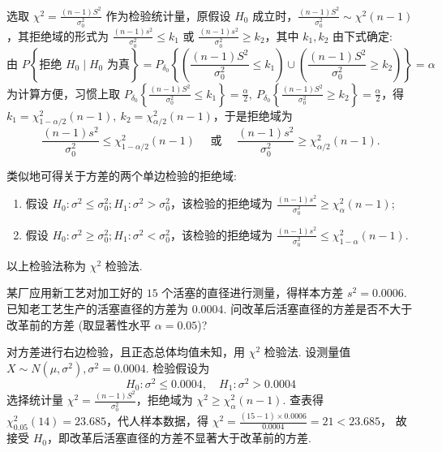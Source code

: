 选取 $\displaystyle \chi^{2}=\frac{(n-1) S^{2}}{\sigma_{0}^{2}} $ 作为检验统计量，原假设 $ H_{0} $ 成立时，$\displaystyle \frac{(n-1) S^{2}}{\sigma_{0}^{2}} \sim \chi^{2}(n-1)$，其拒绝域的形式为 $\displaystyle \frac{(n-1) s^{2}}{\sigma_{0}^{2}} \leqslant k_{1} $ 或 $\displaystyle \frac{(n-1) s^{2}}{\sigma_{0}^{2}} \geqslant k_{2} $，其中 $ k_{1}, k_{2} $ 由下式确定:
$$\text{由 }  P\left\{ \right. \text{拒绝 }  H_{0} \mid H_{0} \left.  \text{ 为真}  \right\}=P_{\delta_{0}}\left\{\left(\frac{(n-1) S^{2}}{\sigma_{0}^{2}} \leqslant k_{1}\right) \cup\left(\frac{(n-1) S^{2}}{\sigma_{0}^{2}} \geqslant k_{2}\right)\right\}=\alpha$$
为计算方便，习惯上取 $\displaystyle P_{\delta_{0}}\left\{\frac{(n-1) S^{2}}{\sigma_{0}^{2}} \leqslant k_{1}\right\}=\frac{\alpha}{2},~ P_{\delta_0}\left\{\frac{(n-1) S^{2}}{\sigma_{0}^{2}} \geqslant k_{2}\right\}=\frac{\alpha}{2} $，得 $ k_{1}=\chi_{1-\alpha / 2}^{2}(n-1) ,~  k_{2}=\chi_{\alpha / 2}^{2}(n-1) $，于是拒绝域为
$$\frac{(n-1) s^{2}}{\sigma_{0}^{2}} \leqslant \chi_{1-\alpha / 2}^{2}(n-1) \quad \text { 或 } \quad \frac{(n-1) s^{2}}{\sigma_{0}^{2}} \geqslant \chi_{\alpha / 2}^{2}(n-1) .$$

类似地可得关于方差的两个单边检验的拒绝域:

\begin{enumerate}[label=(\arabic{*})]
    \item 假设 $ H_{0}: \sigma^{2} \leqslant \sigma_{0}^{2} ; H_{1}: \sigma^{2}>\sigma_{0}^{2} $，该检验的拒绝域为 $\displaystyle \frac{(n-1) s^{2}}{\sigma_{0}^{2}} \geqslant \chi_{\alpha}^{2}(n-1) $;
    \item 假设 $ H_{0}: \sigma^{2} \geqslant \sigma_{0}^{2} ; H_{1}: \sigma^{2}<\sigma_{0}^{2} $，该检验的拒绝域为 $\displaystyle \frac{(n-1) s^{2}}{\sigma_{0}^{2}} \leqslant \chi_{1-\alpha}^{2}(n-1) $.
\end{enumerate}
以上检验法称为 $ \chi^{2} $ 检验法.

\begin{example}
    某厂应用新工艺对加工好的 $15 $ 个活塞的直径进行测量，得样本方差 $ s^{2}=  0.0006$. 
    已知老工艺生产的活塞直径的方差为 $0.0004$. 问改革后活塞直径的方差是否不大于改革前的方差 (取显著性水平 $ \alpha=0.05$)?
\end{example}
\begin{solution}
    对方差进行右边检验，且正态总体均值未知，用 $ \chi^{2} $ 检验法. 
    设测量值 $ X \sim N\left(\mu, \sigma^{2}\right), \sigma^{2}=0.0004 $.
    检验假设为
    $$H_{0}: \sigma^{2} \leqslant 0.0004, \quad H_{1}: \sigma^{2}>0.0004 $$
    选择统计量 $\displaystyle \chi^{2}=\frac{(n-1) S^{2}}{\sigma_{0}^{2}} $，拒绝域为 $ \chi^{2} \geqslant \chi_{\alpha}^{2}(n-1) $. 
    查表得 $ \chi_{0.05}^{2}(14)=23.685$，代人样本数据，得 $\displaystyle \chi^{2}=\frac{(15-1) \times 0.0006}{0.0004}=21<23.685 $，
    故接受 $ H_{0} $，即改革后活塞直径的方差不显著大于改革前的方差.
\end{solution}

